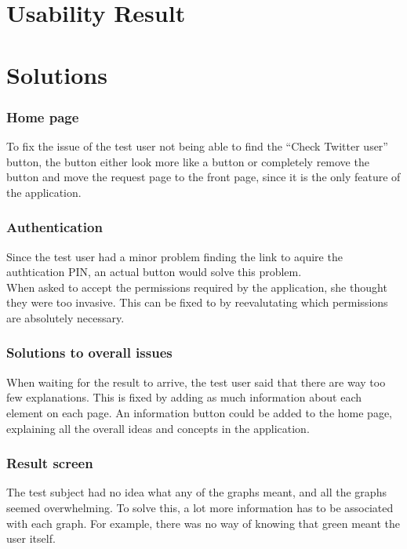 \section{Usability Result}\label{sec:UXUR}


\section{Solutions}

\subsubsection{Home page}
To fix the issue of the test user not being able to find the ``Check Twitter
user'' button, the button either look more like a button or completely remove
the button and move the request page to the front page, since it is the only
feature of the application.

\subsubsection{Authentication}
Since the test user had a minor problem finding the link to aquire the
authtication PIN, an actual button would solve this problem.\\
When asked to accept the permissions required by the application, she thought
they were too invasive. This can be fixed to by reevalutating which permissions
are absolutely necessary.

\subsubsection{Solutions to overall issues}
When waiting for the result to arrive, the test user said that there are way too
few explanations. This is fixed by adding as much information about each element
on each page. An information button could be added to the home page, explaining
all the overall ideas and concepts in the application.

\subsubsection{Result screen}
The test subject had no idea what any of the graphs meant, and all the graphs
seemed overwhelming. To solve this, a lot more information has to be
associated with each graph. For example, there was no way of knowing that green
meant the user itself. 


